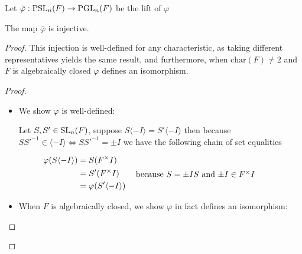 \begin{definition}
    Let $\bar{\varphi} : \operatorname{PSL}_n(F) \rightarrow \operatorname{PGL}_n(F)$ be the lift of $\varphi$
\end{definition}

\begin{lemma}
    The map $\bar{\varphi}$ is injective.
\end{lemma}


\begin{proof}

This injection is well-defined for any characteristic, as taking different representatives yields the same result, and furthermore, when $\textrm{char}(F) \ne 2$ and $F$ is algebraically closed $\varphi$ defines an isomorphism.



\begin{proof}
\begin{itemize}
    \item We show $\varphi$ is well-defined:

Let $S, S' \in \operatorname{SL}_n(F)$, suppose $S \langle -I\rangle = S'\langle -I\rangle$ then because $SS'^{-1} \in \langle -I\rangle \iff SS'^{-1} = \pm I$ we have the following chain of set equalities

\begin{align*}
    \varphi(S \langle -I \rangle) 
    &= S (F^\times I)\\
    &= S' (F^\times I) \qquad \parbox[c]{0.5
    \linewidth}{because $S = \pm I S$ and $\pm I \in F^\times I$}\\
    &= \varphi(S' \langle -I\rangle)
\end{align*}

\item When $F$ is algebraically closed, we show $\varphi$ in fact defines an isomorphism:


\end{itemize}
\end{proof}
\end{proof}
